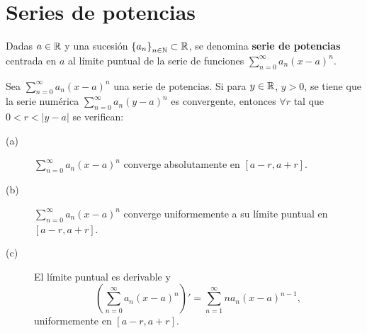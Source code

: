 \section{Series de potencias}
\begin{fdefinition}
	\normalfont Dadas $\displaystyle a \in \mathbb{R} $ y una sucesión $\displaystyle \left\{ a_{n}\right\} _{n\in\mathbb{N}}\subset \mathbb{R} $, se denomina \textbf{serie de potencias} centrada en $\displaystyle a $ al límite puntual de la serie de funciones $\displaystyle \sum^{\infty}_{n = 0}a_{n}\left(x-a\right)^{n} $.
\end{fdefinition}
\begin{ftheorem}[]
\normalfont Sea $\displaystyle \sum^{\infty}_{n = 0}a_{n}\left(x-a\right)^{n} $ una serie de potencias. Si para $\displaystyle y \in \mathbb{R} $, $\displaystyle y > 0 $, se tiene que la serie numérica $\displaystyle \sum^{\infty}_{n = 0}a_{n}\left(y-a\right)^{n} $ es convergente, entonces $\displaystyle \forall r  $ tal que $\displaystyle 0<r< \left|y - a\right| $ se verifican:
\begin{description}
	\item[(a)] $\displaystyle \sum^{\infty}_{n = 0}a_{n}\left(x-a\right)^{n} $ converge absolutamente en $\displaystyle \left[a-r, a+r\right]  $.
	\item[(b)] $\displaystyle \sum^{\infty}_{n = 0}a_{n}\left(x-a\right)^{n} $ converge uniformemente a su límite puntual en $\displaystyle \left[a-r, a + r\right]  $.
	\item[(c)] El límite puntual es derivable y 
		\[ \left(\sum^{\infty}_{n = 0}a_{n}\left(x-a\right)^{n}\right)' = \sum^{\infty}_{n = 1}na_{n}\left(x-a\right)^{n-1},\]
		uniformemente en $\displaystyle \left[a-r,a +r\right]  $.
\end{description}
\end{ftheorem}
